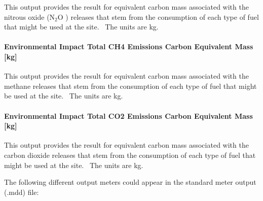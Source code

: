 This output provides the result for equivalent carbon mass associated with the nitrous oxide (N\(_{2}\)O ) releases that stem from the consumption of each type of fuel that might be used at the site.~ The units are kg.

\paragraph{Environmental Impact Total CH4 Emissions Carbon Equivalent Mass {[}kg{]}}\label{environmental-impact-total-ch4-emissions-carbon-equivalent-mass-kg}

This output provides the result for equivalent carbon mass associated with the methane releases that stem from the consumption of each type of fuel that might be used at the site.~ The units are kg.

\paragraph{Environmental Impact Total CO2 Emissions Carbon Equivalent Mass {[}kg{]}}\label{environmental-impact-total-co2-emissions-carbon-equivalent-mass-kg}

This output provides the result for equivalent carbon mass associated with the carbon dioxide releases that stem from the consumption of each type of fuel that might be used at the site.~ The units are kg.

The following different output meters could appear in the standard meter output (.mdd) file:

